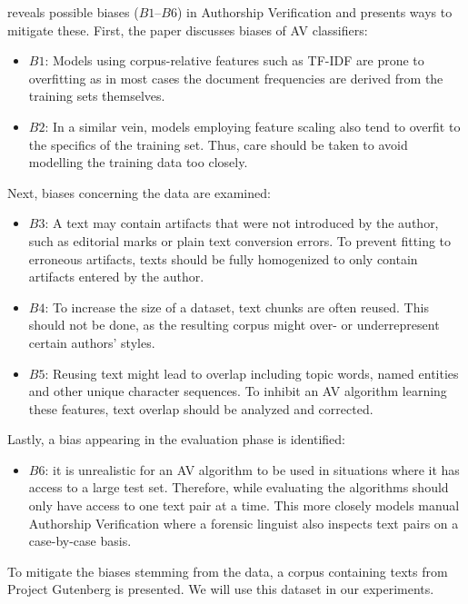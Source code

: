 \cite{stein2019unbiasedGutenbergCorpus} reveals possible biases ($B1$--$B6$) in Authorship Verification and presents ways to mitigate these.
First, the paper discusses biases of AV classifiers:
\begin{itemize}
    \item $B1$: Models using corpus-relative features such as TF-IDF are prone to overfitting as in most cases the document frequencies are derived from the training sets themselves.
    \item $B2$: In a similar vein, models employing feature scaling also tend to overfit to the specifics of the training set.
Thus, care should be taken to avoid modelling the training data too closely.
\end{itemize}
Next, biases concerning the data are examined:
\begin{itemize}
    \item $B3$: A text may contain artifacts that were not introduced by the author, such as editorial marks or plain text conversion errors.
To prevent fitting to erroneous artifacts, texts should be fully homogenized to only contain artifacts entered by the author.
    \item $B4$: To increase the size of a dataset, text chunks are often reused.
This should not be done, as the resulting corpus might over- or underrepresent certain authors' styles.
    \item $B5$: Reusing text might lead to overlap including topic words, named entities and other unique character sequences.
To inhibit an AV algorithm learning these features, text overlap should be analyzed and corrected.
\end{itemize}
Lastly, a bias appearing in the evaluation phase is identified:
\begin{itemize}
    \item $B6$: it is unrealistic for an AV algorithm to be used in situations where it has access to a large test set.
Therefore, while evaluating the algorithms should only have access to one text pair at a time.
This more closely models manual Authorship Verification where a forensic linguist also inspects text pairs on a case-by-case basis.
\end{itemize}
To mitigate the biases stemming from the data, a corpus containing texts from Project Gutenberg is presented.
We will use this dataset in our experiments.\\


